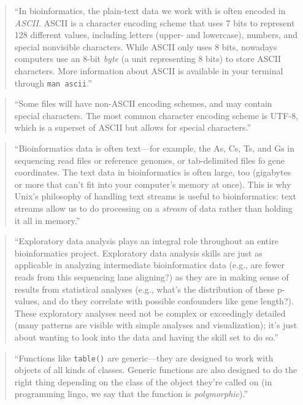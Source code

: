 \documentclass[]{tufte-book}
\begin{document}
\begin{quote}
``In bioinformatics, the plain-text data we work with is often encoded in \emph{ASCII}.
ASCII is a character encoding scheme that uses 7 bits to represent 128 different
values, including letters (upper- and lowercase), numbers, and special nonvisible
characters. While ASCII only uses 8 bits, nowadays computers use an 8-bit \emph{byte}
(a unit representing 8 bits) to store ASCII characters. More information about
ASCII is available in your terminal through \texttt{man\ ascii}.'' \citep{buffalo2015bioinformatics}
\end{quote}

\begin{quote}
``Some files will have non-ASCII encoding schemes, and may contain special characters.
The most common character encoding scheme is UTF-8, which is a superset of ASCII
but allows for special characters.'' \citep{buffalo2015bioinformatics}
\end{quote}

\begin{quote}
``Bioinformatics data is often text---for example, the As, Cs, Ts, and Gs in
sequencing read files or reference genomes, or tab-delimited files fo gene coordinates.
The text data in bioinformatics is often large, too (gigabytes or more that can't
fit into your computer's memory at once). This is why Unix's philosophy of
handling text streams is useful to bioinformatics: text streams allow us to
do processing on a \emph{stream} of data rather than holding it all in memory.''
\citep{buffalo2015bioinformatics}
\end{quote}

\begin{quote}
``Exploratory data analysis plays an integral role throughout an entire bioinformatics
project. Exploratory data analysis skills are just as applicable in analyzing intermediate
bioinformatics data (e.g., are fewer reads from this sequencing lane aligning?) as
they are in making sense of results from statistical analyses (e.g., what's the distribution
of these p-values, and do they correlate with possible confounders like gene length?).
These exploratory analyses need not be complex or exceedingly detailed (many patterns
are visible with simple analyses and visualization); it's just about wanting to look
into the data and having the skill set to do so.'' \citep{buffalo2015bioinformatics}
\end{quote}

\begin{quote}
``Functions like \texttt{table()} are generic---they are designed to work with objects of
all kinds of classes. Generic functions are also designed to do the right thing
depending on the class of the object they're called on (in programming lingo, we
say that the function is \emph{polymorphic}).'' \citep{buffalo2015bioinformatics}
\end{quote}
\end{document}

